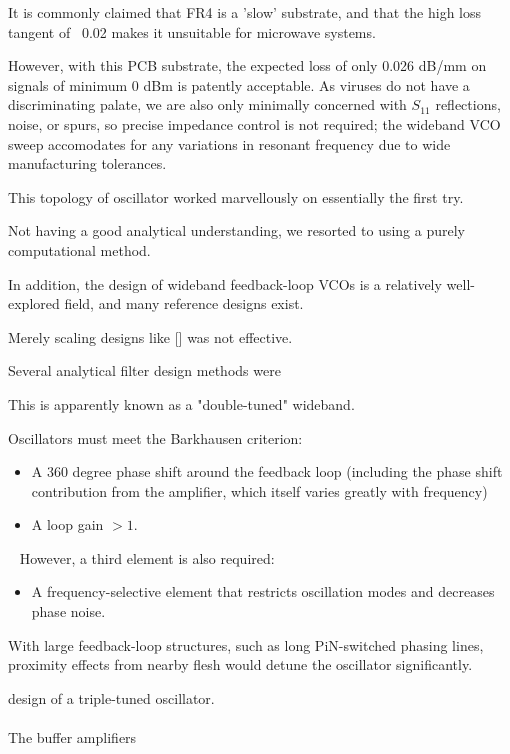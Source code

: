 \documentclass[paper.tex]{subfiles}
\begin{document}
It is commonly claimed that FR4 is a 'slow' substrate, and that the high loss tangent of ~0.02 makes it unsuitable for microwave systems.

However, with this PCB substrate, the expected loss of only 0.026 dB/mm on signals of minimum 0 dBm is patently acceptable. As viruses do not have a discriminating palate, we are also only minimally concerned with $S_{11}$ reflections, noise, or spurs, so precise impedance control is not required; the wideband VCO sweep accomodates for any variations in resonant frequency due to wide manufacturing tolerances.


This topology of oscillator worked marvellously on essentially the first try.

Not having a good analytical understanding, we resorted to using a purely computational method.

In addition, the design of wideband feedback-loop VCOs is a relatively well-explored field, and many reference designs exist. 

Merely scaling designs like [] was not effective.





Several analytical filter design methods were 

This is apparently known as a "double-tuned" wideband.


Oscillators must meet the Barkhausen criterion:

\begin{itemize}

\item A 360 degree phase shift around the feedback loop (including the phase shift contribution from the amplifier, which itself varies greatly with frequency)
\item A loop gain $>1.$ 

\end{itemize}\
%
However, a third element is also required:
%
\begin{itemize}
\item A frequency-selective element that restricts oscillation modes and decreases phase noise.
\end{itemize}
%

With large feedback-loop structures, such as long PiN-switched phasing lines, proximity effects from nearby flesh would detune the oscillator significantly.

 design of a triple-tuned oscillator.


\paragraph{}
The buffer amplifiers 
\end{document}
